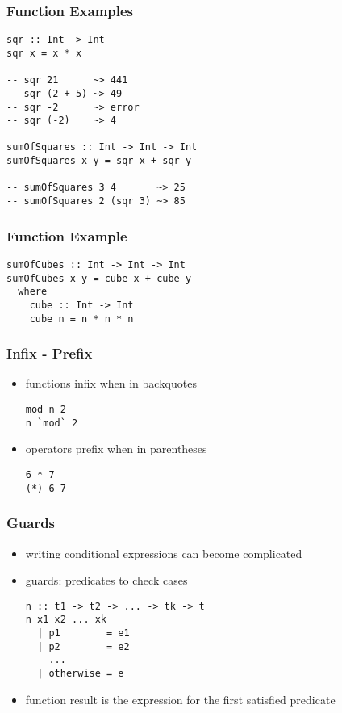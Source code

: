 \documentclass[dvipsnames]{beamer}
\theoremstyle{plain}
\begin{document}
\begin{frame}[fragile]
  \frametitle{Function Examples}

  \begin{lstlisting}
sqr :: Int -> Int
sqr x = x * x

-- sqr 21      ~> 441
-- sqr (2 + 5) ~> 49
-- sqr -2      ~> error
-- sqr (-2)    ~> 4

sumOfSquares :: Int -> Int -> Int
sumOfSquares x y = sqr x + sqr y

-- sumOfSquares 3 4       ~> 25
-- sumOfSquares 2 (sqr 3) ~> 85
  \end{lstlisting}
\end{frame}

\begin{frame}[fragile]
  \frametitle{Function Example}

  \begin{lstlisting}
sumOfCubes :: Int -> Int -> Int
sumOfCubes x y = cube x + cube y
  where
    cube :: Int -> Int
    cube n = n * n * n
  \end{lstlisting}
\end{frame}

\begin{frame}[fragile]
  \frametitle{Infix - Prefix}

  \begin{itemize}
    \item functions infix when in backquotes
    \begin{lstlisting}
mod n 2
n `mod` 2
    \end{lstlisting}

    \pause
    \medskip
    \item operators prefix when in parentheses
    \begin{lstlisting}
6 * 7
(*) 6 7
    \end{lstlisting}
  \end{itemize}
\end{frame}

\begin{frame}[fragile]
  \frametitle{Guards}

  \begin{itemize}
    \item writing conditional expressions can become complicated
    \item \alert{guards}: predicates to check cases

    \begin{lstlisting}[style=syntax]
n :: t1 -> t2 -> ... -> tk -> t
n x1 x2 ... xk
  | p1        = e1
  | p2        = e2
    ...
  | otherwise = e
    \end{lstlisting}

    \item function result is the expression for the first satisfied predicate
  \end{itemize}
\end{frame}
\end{document}
